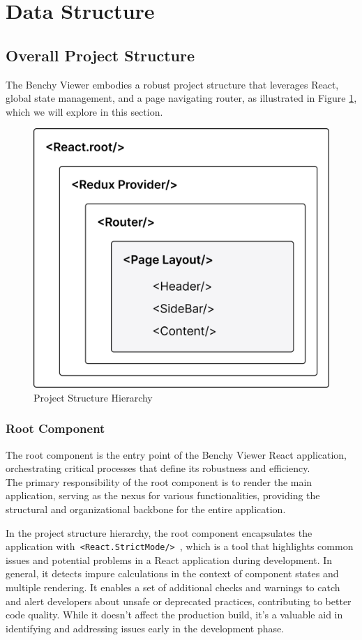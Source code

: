 \section{Data Structure}


\subsection{Overall Project Structure}

The Benchy Viewer embodies a robust project structure that leverages React, global state management, and a page navigating router, as illustrated in Figure \ref{fig:project-structure}, which we will explore in this section.

\begin{figure}[h]
  \vspace{0.5cm}
  \centering
  \includegraphics[width=0.5\linewidth]{figures/project-structure.png}
  \caption{Project Structure Hierarchy}
  \label{fig:project-structure}
\end{figure}

\subsubsection{Root Component}
The root component is the entry point of the Benchy Viewer React application, orchestrating critical processes that define its robustness and efficiency.\\
The primary responsibility of the root component is to render the main application, serving as the nexus for various functionalities, providing the structural and organizational backbone for the entire application. 

In the project structure hierarchy, the root component encapsulates the application with\texttt{ <React.StrictMode/>}~\parencite{reactstrictmode}, which is a tool that highlights common issues and potential problems in a React application during development.
In general, it detects impure calculations in the context of component states and multiple rendering. It enables a set of additional checks and warnings to catch and alert developers about unsafe or deprecated practices, contributing to better code quality. While it doesn't affect the production build, it's a valuable aid in identifying and addressing issues early in the development phase.


